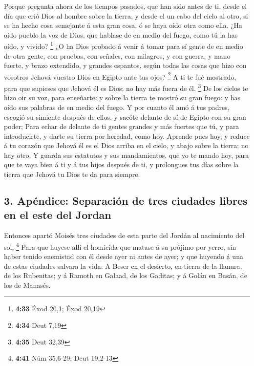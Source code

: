  Porque pregunta ahora de los tiempos pasados, que han
sido antes de ti, desde el día que crió Dios al hombre sobre la tierra,
y desde el un cabo del cielo al otro, si se ha hecho cosa semejante á
esta gran cosa, ó se haya oído otra como ella.  ¿Ha oído
pueblo la voz de Dios, que hablase de en medio del fuego, como tú la has
oído, y vivido? \footnote{\textbf{4:33} Éxod 20,1; Éxod 20,19}
 ¿O ha Dios probado á venir á tomar para sí gente de en
medio de otra gente, con pruebas, con señales, con milagros, y con
guerra, y mano fuerte, y brazo extendido, y grandes espantos, según
todas las cosas que hizo con vosotros Jehová vuestro Dios en Egipto ante
tus ojos? \footnote{\textbf{4:34} Deut 7,19}  A ti te fué
mostrado, para que supieses que Jehová él es Dios; no hay más fuera de
él. \footnote{\textbf{4:35} Deut 32,39}  De los cielos te
hizo oir su voz, para enseñarte: y sobre la tierra te mostró su gran
fuego: y has oído sus palabras de en medio del fuego.  Y
por cuanto él amó á tus padres, escogió su simiente después de ellos, y
sacóte delante de sí de Egipto con su gran poder;  Para
echar de delante de ti gentes grandes y más fuertes que tú, y para
introducirte, y darte su tierra por heredad, como hoy. 
Aprende pues hoy, y reduce á tu corazón que Jehová él es el Dios arriba
en el cielo, y abajo sobre la tierra; no hay otro.  Y
guarda sus estatutos y sus mandamientos, que yo te mando hoy, para que
te vaya bien á ti y á tus hijos después de ti, y prolongues tus días
sobre la tierra que Jehová tu Dios te da para siempre.

\hypertarget{apuxe9ndice-separaciuxf3n-de-tres-ciudades-libres-en-el-este-del-jordan}{%
\subsection{3. Apéndice: Separación de tres ciudades libres en el este
del
Jordan}\label{apuxe9ndice-separaciuxf3n-de-tres-ciudades-libres-en-el-este-del-jordan}}

 Entonces apartó Moisés tres ciudades de esta parte del
Jordán al nacimiento del sol, \footnote{\textbf{4:41} Núm 35,6-29; Deut
  19,2-13}  Para que huyese allí el homicida que matase á
su prójimo por yerro, sin haber tenido enemistad con él desde ayer ni
antes de ayer; y que huyendo á una de estas ciudades salvara la vida:
 A Beser en el desierto, en tierra de la llanura, de los
Rubenitas; y á Ramoth en Galaad, de los Gaditas; y á Golán en Basán, de
los de Manasés.


